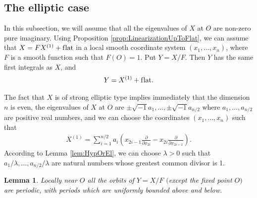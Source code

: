 \documentclass[pdftex]{sigma}
\numberwithin{equation}{section}
\newtheorem{lem}[thm]{Lemma}
\begin{document}
\subsection{The elliptic case} In this subsection, we will assume that all the eigenvalues of $X$ at $O$
are non-zero pure imaginary. Using Proposition \ref{prop:LinearizationUpToFlat}, we can assume that
$X = FX^{(1)} + \text{f\/lat}$ in a local smooth coordinate system $(x_1,\dots,x_n)$, where $F$ is a smooth
function such that $F(O) =1$. Put $Y = X/F$. Then $Y$ has the same f\/irst integrals as $X$, and
\begin{gather*} %
 Y = X^{(1)} + \text{f\/lat}.
\end{gather*}

The fact that $X$ is of strong elliptic type implies immediately that the dimension $n$ is even, the eigenvalues of $X$
at $O$ are $\pm \sqrt{-1} a_1,\dots, \pm \sqrt{-1} a_{n/2}$ where $a_1, \dots, a_{n/2}$ are positive real numbers,
and we can choose the coordinates $(x_1,\dots,x_n)$ such that
\begin{gather} \label{eqn:LinearElliptic}
 X^{(1)} = \sum_{i=1}^{n/2} a_i \left(x_{2i-1} \frac{\partial}{\partial x_{2i}} - x_{2i} \frac{\partial}{\partial x_{2i-1}}\right).
\end{gather}
According to Lemma \ref{lem:HypOrEl}, we can choose $\lambda > 0$ such that $a_1/\lambda, \dots, a_{n/2}/ \lambda$
are natural numbers whose greatest common divisor is 1.

\begin{lem} \label{lem:AllPeriodic}
Locally near $O$ all the orbits of $Y = X/F$ $($except the fixed point $O)$ are periodic, with periods which
are uniformly bounded above and below.
\end{lem}
\end{document}
